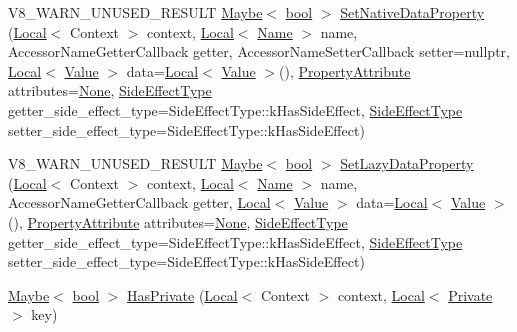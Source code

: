 \begin{DoxyCompactItemize}
V8\+\_\+\+W\+A\+R\+N\+\_\+\+U\+N\+U\+S\+E\+D\+\_\+\+R\+E\+S\+U\+LT \mbox{\hyperlink{classv8_1_1Maybe}{Maybe}}$<$ \mbox{\hyperlink{classbool}{bool}} $>$ \mbox{\hyperlink{classv8_1_1Object_a437ba98e4d80b312bd5ee1f920d89eda}{Set\+Native\+Data\+Property}} (\mbox{\hyperlink{classv8_1_1Local}{Local}}$<$ Context $>$ context, \mbox{\hyperlink{classv8_1_1Local}{Local}}$<$ \mbox{\hyperlink{classv8_1_1Name}{Name}} $>$ name, Accessor\+Name\+Getter\+Callback getter, Accessor\+Name\+Setter\+Callback setter=nullptr, \mbox{\hyperlink{classv8_1_1Local}{Local}}$<$ \mbox{\hyperlink{classv8_1_1Value}{Value}} $>$ data=\mbox{\hyperlink{classv8_1_1Local}{Local}}$<$ \mbox{\hyperlink{classv8_1_1Value}{Value}} $>$(), \mbox{\hyperlink{namespacev8_a05f25f935e108a1ea2d150e274602b87}{Property\+Attribute}} attributes=\mbox{\hyperlink{namespacev8_a05f25f935e108a1ea2d150e274602b87a7ab4d58719c33b3ea2dfaefa29b111df}{None}}, \mbox{\hyperlink{namespacev8_a29711319c2b9fc7716d65faee2f7b9cb}{Side\+Effect\+Type}} getter\+\_\+side\+\_\+effect\+\_\+type=Side\+Effect\+Type\+::k\+Has\+Side\+Effect, \mbox{\hyperlink{namespacev8_a29711319c2b9fc7716d65faee2f7b9cb}{Side\+Effect\+Type}} setter\+\_\+side\+\_\+effect\+\_\+type=Side\+Effect\+Type\+::k\+Has\+Side\+Effect)
\item 
V8\+\_\+\+W\+A\+R\+N\+\_\+\+U\+N\+U\+S\+E\+D\+\_\+\+R\+E\+S\+U\+LT \mbox{\hyperlink{classv8_1_1Maybe}{Maybe}}$<$ \mbox{\hyperlink{classbool}{bool}} $>$ \mbox{\hyperlink{classv8_1_1Object_a918a985db244fdc1bde268741e840620}{Set\+Lazy\+Data\+Property}} (\mbox{\hyperlink{classv8_1_1Local}{Local}}$<$ Context $>$ context, \mbox{\hyperlink{classv8_1_1Local}{Local}}$<$ \mbox{\hyperlink{classv8_1_1Name}{Name}} $>$ name, Accessor\+Name\+Getter\+Callback getter, \mbox{\hyperlink{classv8_1_1Local}{Local}}$<$ \mbox{\hyperlink{classv8_1_1Value}{Value}} $>$ data=\mbox{\hyperlink{classv8_1_1Local}{Local}}$<$ \mbox{\hyperlink{classv8_1_1Value}{Value}} $>$(), \mbox{\hyperlink{namespacev8_a05f25f935e108a1ea2d150e274602b87}{Property\+Attribute}} attributes=\mbox{\hyperlink{namespacev8_a05f25f935e108a1ea2d150e274602b87a7ab4d58719c33b3ea2dfaefa29b111df}{None}}, \mbox{\hyperlink{namespacev8_a29711319c2b9fc7716d65faee2f7b9cb}{Side\+Effect\+Type}} getter\+\_\+side\+\_\+effect\+\_\+type=Side\+Effect\+Type\+::k\+Has\+Side\+Effect, \mbox{\hyperlink{namespacev8_a29711319c2b9fc7716d65faee2f7b9cb}{Side\+Effect\+Type}} setter\+\_\+side\+\_\+effect\+\_\+type=Side\+Effect\+Type\+::k\+Has\+Side\+Effect)
\item 
\mbox{\hyperlink{classv8_1_1Maybe}{Maybe}}$<$ \mbox{\hyperlink{classbool}{bool}} $>$ \mbox{\hyperlink{classv8_1_1Object_ab2db3e98feaca9b9ae2f3fc3082ef3d5}{Has\+Private}} (\mbox{\hyperlink{classv8_1_1Local}{Local}}$<$ Context $>$ context, \mbox{\hyperlink{classv8_1_1Local}{Local}}$<$ \mbox{\hyperlink{classv8_1_1Private}{Private}} $>$ key)

\end{DoxyCompactItemize}
